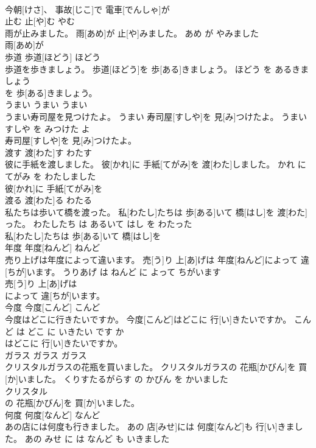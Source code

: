 \documentclass[8pt]{extreport}
\begin{document}
\begin{CJK}{UTF8}{min}
\\	今朝[けさ]、 事故[じこ]で 電車[でんしゃ]が
\\	止む	止[や]む	やむ	
\\	雨が止みました。	雨[あめ]が 止[や]みました。	あめ が やみました	
\\	雨[あめ]が
\\	歩道	歩道[ほどう]	ほどう	
\\	歩道を歩きましょう。	歩道[ほどう]を 歩[ある]きましょう。	ほどう を あるきましょう	
\\	を 歩[ある]きましょう。			
\\	うまい	うまい	うまい	
\\	うまい寿司屋を見つけたよ。	うまい 寿司屋[すしや]を 見[み]つけたよ。	うまい すしや を みつけた よ	
\\	寿司屋[すしや]を 見[み]つけたよ。			
\\	渡す	渡[わた]す	わたす	
\\	彼に手紙を渡しました。	彼[かれ]に 手紙[てがみ]を 渡[わた]しました。	かれ に てがみ を わたしました	
\\	彼[かれ]に 手紙[てがみ]を
\\	渡る	渡[わた]る	わたる	
\\	私たちは歩いて橋を渡った。	私[わたし]たちは 歩[ある]いて 橋[はし]を 渡[わた]った。	わたしたち は あるいて はし を わたった	
\\	私[わたし]たちは 歩[ある]いて 橋[はし]を
\\	年度	年度[ねんど]	ねんど	
\\	売り上げは年度によって違います。	売[う]り 上[あ]げは 年度[ねんど]によって 違[ちが]います。	うりあげ は ねんど に よって ちがいます	
\\	売[う]り 上[あ]げは
\\	によって 違[ちが]います。			
\\	今度	今度[こんど]	こんど	
\\	今度はどこに行きたいですか。	今度[こんど]はどこに 行[い]きたいですか。	こんど は どこ に いきたい です か	
\\	はどこに 行[い]きたいですか。			
\\	ガラス	ガラス	ガラス	
\\	クリスタルガラスの花瓶を買いました。	クリスタルガラスの 花瓶[かびん]を 買[か]いました。	くりすたるがらす の かびん を かいました	
\\	クリスタル
\\	の 花瓶[かびん]を 買[か]いました。			
\\	何度	何度[なんど]	なんど	
\\	あの店には何度も行きました。	あの 店[みせ]には 何度[なんど]も 行[い]きました。	あの みせ に は なんど も いきました	

\end{CJK}
\end{document}
